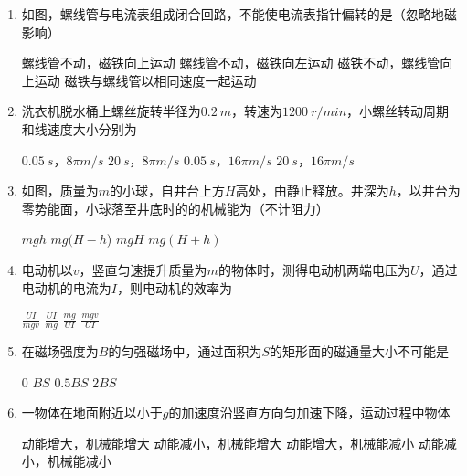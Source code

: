 \begin{enumerate}
\item 
如图，螺线管与电流表组成闭合回路，不能使电流表指针偏转的是（忽略地磁影响）  
\begin{figure}[h!]
\centering

\end{figure}

\fourchoices
{螺线管不动，磁铁向上运动}
{螺线管不动，磁铁向左运动}
{磁铁不动，螺线管向上运动}
{磁铁与螺线管以相同速度一起运动}





\item
洗衣机脱水桶上螺丝旋转半径为$ 0.2 \ m $，转速为$ 1200 \ r/min $，小螺丝转动周期和线速度大小分别为  

\fourchoices
{$ 0.05 \ s $，$ 8 \pi m/s $}
{$ 20 \ s $，$ 8 \pi m/s $}
{$ 0.05 \ s $，$ 16 \pi m/s $}
{$ 20 \ s $，$ 16 \pi m/s $}



\item
如图，质量为$ m $的小球，自井台上方$ H $高处，由静止释放。井深为$ h $，以井台为零势能面，小球落至井底时的的机械能为（不计阻力）  
\begin{figure}[h!]
\centering

\end{figure}

\fourchoices
{$ mgh $}
{$ mg ( H-h $) }
{$ mgH $}
{$ mg ( H+h) $}




\item
电动机以$ v $，竖直匀速提升质量为$ m $的物体时，测得电动机两端电压为$ U $，通过电动机的电流为$ I $，则电动机的效率为  


\fourchoices
{$\frac{U I}{m g v}$}
{$\frac{U I}{m g}$}
{$\frac{m g}{U I}$}
{$\frac{m g v}{U I}$}




\item
在磁场强度为$ B $的匀强磁场中，通过面积为$ S $的矩形面的磁通量大小不可能是  

\fourchoices
{$ 0 $}
{$ BS $}
{$ 0.5BS $}
{$ 2BS $}





\item
一物体在地面附近以小于$ g $的加速度沿竖直方向匀加速下降，运动过程中物体  

\fourchoices
{动能增大，机械能增大}
{动能减小，机械能增大}
{动能增大，机械能减小}
{动能减小，机械能减小}





\end{enumerate}
